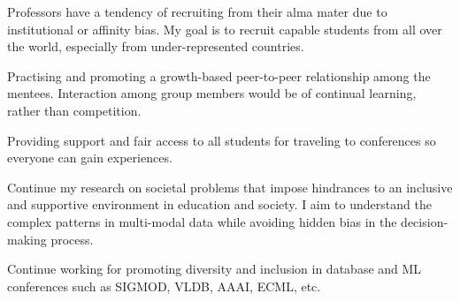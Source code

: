 %
\begin{enumerate*}[leftmargin=*, noitemsep, topsep=0pt, label=(\arabic*)]
    \item Professors have a tendency of recruiting from their alma mater due to institutional or affinity bias. My goal is to recruit capable students from all over the world, especially from under-represented countries.
    \item Practising and promoting a growth-based peer-to-peer relationship among the mentees. Interaction among group members would be of continual learning, rather than competition.
    \item Providing support and fair access to all students for traveling to conferences so everyone can gain experiences.
    \item Continue my research on societal problems that impose hindrances to an inclusive and supportive environment in education and society. I aim to understand the complex patterns in multi-modal data while avoiding hidden bias in the decision-making process. 
    \item Continue working for promoting diversity and inclusion in database and ML conferences such as SIGMOD, VLDB, AAAI, ECML, etc.
\end{enumerate*}